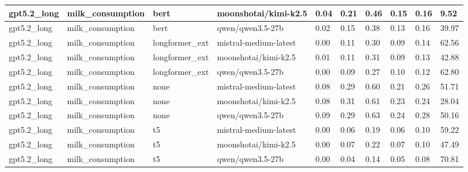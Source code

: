 \begin{tabular}{|l|l|l|l|l|l|l|l|l|l|}
 \hline
 gpt5.2\_long & milk\_consumption & bert & moonshotai/kimi-k2.5 & 0.04 & 0.21 & 0.46 & 0.15 & 0.16 & 9.52 \\
 \hline
 gpt5.2\_long & milk\_consumption & bert & qwen/qwen3.5-27b & 0.02 & 0.15 & 0.38 & 0.13 & 0.16 & 39.97 \\
 \hline
 gpt5.2\_long & milk\_consumption & longformer\_ext & mistral-medium-latest & 0.00 & 0.11 & 0.30 & 0.09 & 0.14 & 62.56 \\
 \hline
 gpt5.2\_long & milk\_consumption & longformer\_ext & moonshotai/kimi-k2.5 & 0.01 & 0.11 & 0.31 & 0.09 & 0.13 & 42.88 \\
 \hline
 gpt5.2\_long & milk\_consumption & longformer\_ext & qwen/qwen3.5-27b & 0.00 & 0.09 & 0.27 & 0.10 & 0.12 & 62.80 \\
 \hline
 gpt5.2\_long & milk\_consumption & none & mistral-medium-latest & 0.08 & 0.29 & 0.60 & 0.21 & 0.26 & 51.71 \\
 \hline
 gpt5.2\_long & milk\_consumption & none & moonshotai/kimi-k2.5 & 0.08 & 0.31 & 0.61 & 0.23 & 0.24 & 28.04 \\
 \hline
 gpt5.2\_long & milk\_consumption & none & qwen/qwen3.5-27b & 0.09 & 0.29 & 0.63 & 0.24 & 0.28 & 50.16 \\
 \hline
 gpt5.2\_long & milk\_consumption & t5 & mistral-medium-latest & 0.00 & 0.06 & 0.19 & 0.06 & 0.10 & 59.22 \\
 \hline
 gpt5.2\_long & milk\_consumption & t5 & moonshotai/kimi-k2.5 & 0.00 & 0.07 & 0.22 & 0.07 & 0.10 & 47.49 \\
 \hline
 gpt5.2\_long & milk\_consumption & t5 & qwen/qwen3.5-27b & 0.00 & 0.04 & 0.14 & 0.05 & 0.08 & 70.81 \\
\hline
\end{tabular}
